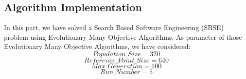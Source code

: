 \documentclass[letterpaper, 10 pt, conference]{ieeeconf}  %
\begin{document}
\subsection{Algorithm Implementation}
In this part, we have solved a Search Based Software Engineering (SBSE) problem using Evolutionary Many Objective Algorithms.
As parameter of those Evolutionary Many Objective Algorithms, we have considered:
\begin{displaymath}\label{population_size}
Population\_Size=320
\end{displaymath}
\begin{displaymath}\label{ref_point}
Reference\_Point\_Size=640
\end{displaymath}
\begin{displaymath} \label{max_gen}
Max\_Generation=100
\end{displaymath}
\begin{displaymath} \label{run_num}
Run\_Number=5
\end{displaymath}
\end{document}

